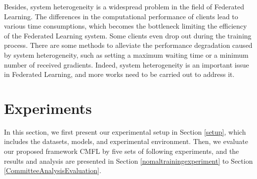 \documentclass[10pt,journal,compsoc]{IEEEtran}
\newcommand{\etal}{\emph{et al.} }
\begin{document}
{Besides, system heterogeneity is a widespread problem in the field of Federated Learning. The differences in the computational performance of clients lead to various time consumptions, which becomes the bottleneck limiting the efficiency of the Federated Learning system. Some clients even drop out during the training process. There are some methods to alleviate the performance degradation caused by system heterogeneity, such as setting a maximum waiting time or a minimum number of received gradients. Indeed, system heterogeneity is an important issue in Federated Learning, and more works need to be carried out to address it.}









\section{Experiments}
\label{experiments}


In this section, we first present our experimental setup in Section \ref{setup}, which includes the datasets, models, and experimental environment. Then, we evaluate our proposed framework CMFL by five sets of following experiments, and the results and analysis are presented in Section \ref{nomaltrainingexperiment} to Section \ref{CommitteeAnalysisEvaluation}.
\end{document}
